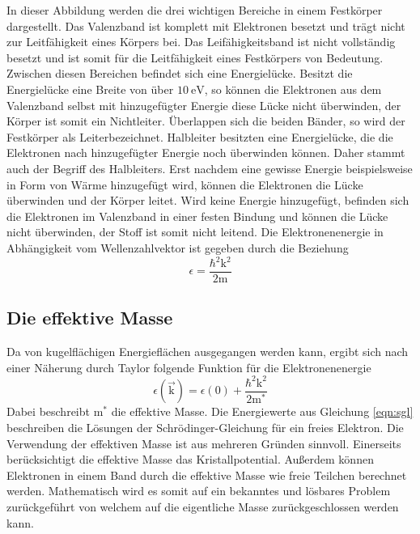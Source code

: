 In dieser Abbildung werden die drei wichtigen Bereiche in einem Festkörper
dargestellt. Das Valenzband ist komplett mit Elektronen besetzt und trägt nicht
zur Leitfähigkeit eines Körpers bei. Das Leifähigkeitsband ist nicht
vollständig besetzt und ist somit für die Leitfähigkeit eines Festkörpers von
Bedeutung. Zwischen diesen Bereichen befindet sich eine Energielücke. Besitzt
die Energielücke eine Breite von über $\SI{10}{\electronvolt}$, so können die
Elektronen aus dem Valenzband selbst mit hinzugefügter Energie diese Lücke nicht
überwinden, der Körper ist somit ein Nichtleiter. Überlappen sich die beiden
Bänder, so wird der Festkörper als Leiterbezeichnet. Halbleiter besitzten eine
Energielücke, die die Elektronen nach hinzugefügter Energie noch überwinden
können. Daher stammt auch der Begriff des Halbleiters. Erst nachdem eine
gewisse Energie beispielsweise in Form von Wärme hinzugefügt wird, können die
Elektronen die Lücke überwinden und der Körper leitet. Wird keine Energie
hinzugefügt, befinden sich die Elektronen im Valenzband in einer festen Bindung
und können die Lücke nicht überwinden, der Stoff ist somit nicht leitend. Die
Elektronenenergie in Abhängigkeit vom Wellenzahlvektor ist gegeben durch die
Beziehung
\begin{equation}
  \epsilon = \frac{\hbar^2 \text{k}^2}{2 \text{m}}
\end{equation}

\subsection{Die effektive Masse}
Da von kugelflächigen Energieflächen ausgegangen werden kann, ergibt sich nach
einer Näherung durch Taylor folgende Funktion für die Elektronenenergie
\begin{equation}
  \epsilon\left(\vec{\text{k}}\right) = \epsilon(0) + \frac{\hbar^2 \text{k}^2}
  {2 \text{m}^*}
  \label{eqn:sgl}
\end{equation}
Dabei beschreibt $\text{m}^*$ die effektive Masse. Die Energiewerte aus
Gleichung \eqref{eqn:sgl} beschreiben die Lösungen der Schrödinger-Gleichung
für ein freies Elektron. Die Verwendung der effektiven Masse ist aus mehreren
Gründen sinnvoll. Einerseits berücksichtigt die effektive Masse das
Kristallpotential. Außerdem können Elektronen in einem Band durch die effektive
Masse wie freie Teilchen berechnet werden. Mathematisch wird es somit auf ein
bekanntes und lösbares Problem zurückgeführt von welchem auf die eigentliche
Masse zurückgeschlossen werden kann.

